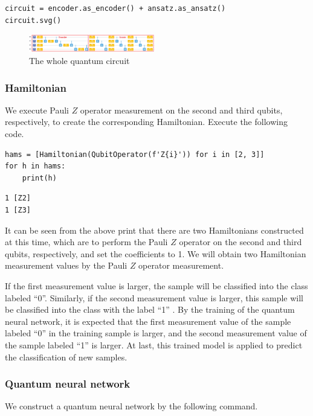 \begin{lstlisting}
circuit = encoder.as_encoder() + ansatz.as_ansatz()                  
circuit.svg()
\end{lstlisting}

\begin{figure}[H]
\centering
\includegraphics[width=0.49\textwidth]{5.1_figures/total-circuit.eps}
\caption{The whole quantum circuit}
\label{5.1total-circuit}
\end{figure}

\subsubsection{Hamiltonian}
We execute Pauli $Z$ operator measurement on the second and third qubits, respectively, to create the corresponding Hamiltonian. Execute the following code.

\begin{lstlisting}
hams = [Hamiltonian(QubitOperator(f'Z{i}')) for i in [2, 3]] 
for h in hams:
    print(h)
\end{lstlisting}

\begin{lstlisting}
1 [Z2]
1 [Z3]
\end{lstlisting}

It can be seen from the above print that there are two Hamiltonians constructed at this time, which are to perform the Pauli $Z$ operator on the second and third qubits, respectively, and set the coefficients to 1. We will obtain two Hamiltonian measurement values by the Pauli $Z$ operator measurement.

If the first measurement value is larger, the sample will be classified into the class labeled ``0''.  Similarly, if the second measurement value is larger, this sample will be classified into the class with the label ``1'' . By the training of the quantum neural network, it is expected that the first measurement value of the sample labeled ``0''  in the training sample is larger, and the second measurement value of the sample labeled ``1'' is larger. At last, this trained model is applied to predict the classification of new samples.

\subsubsection{Quantum neural network}
We construct a quantum neural network by the following command.

